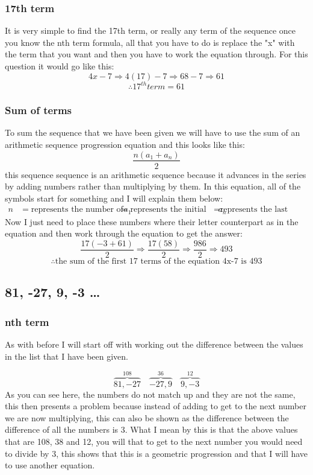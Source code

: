 \documentclass{article}
\begin{document}
\subsubsection{17th term}
It is very simple to find the 17th term, or really any term of the sequence once you know the nth term formula, all that you have to do is replace the "x" with the term that you want and then you have to work the equation through. For this question it would go like this: 
\[
	4x-7 \Rightarrow 4(17)-7 \Rightarrow 68-7 \Rightarrow 61
\]
\[
	\therefore 17^{th} term = 61
\]
\subsubsection{Sum of terms}
To sum the sequence that we have been given we will have to use the sum of an arithmetic sequence progression equation and this looks like this: 
\[
	\frac{n(a_{1} + a_{n})}{2}
\]
this sequence sequence is an arithmetic sequence because it advances in the series by adding numbers rather than multiplying by them. In this equation, all of the symbols start for something and I will explain them below:
\begin{align}

	n &= \mbox{represents the number of terms that you want to add, in this case it is 17}

	a_{1} &= \mbox{represents the initial number of the sequence, in this case it is -3}

	a_{n} &= \mbox{represents the last number of the sequence, in this case this is 61 as we calculated that before}

\end{align}
Now I just need to place these numbers where their letter counterpart as in the equation and then work through the equation to get the answer:
\[
	\frac{17( -3 + 61 )}{2} \Rightarrow \frac{17( 58 )}{2} \Rightarrow \frac{986}{2} \Rightarrow 493 
\]
\[
\therefore \mbox{the sum of the first 17 terms of the equation 4x-7 is 493}
\]
\subsection{81, -27, 9, -3 \dots}
\subsubsection{nth term}
As with before I will start off with working out the difference  between the values in the list that I have been given. 

\[
	\overbrace{81, -27}^{108}	\quad	\overbrace{-27, 9}^{36}	\quad	\overbrace{9, -3}^{12}
\]
As you can see here, the numbers do not match up and they are not the same, this then presents a problem because instead of adding to get to the next number we are now multiplying, this can also be shown as the difference between the difference of all the numbers is 3. What I mean by this is that the above values that are 108, 38 and 12, you will that to get to the next number you would need to divide by 3, this shows that this is a geometric progression and that I will have to use another equation.
\end{document}
